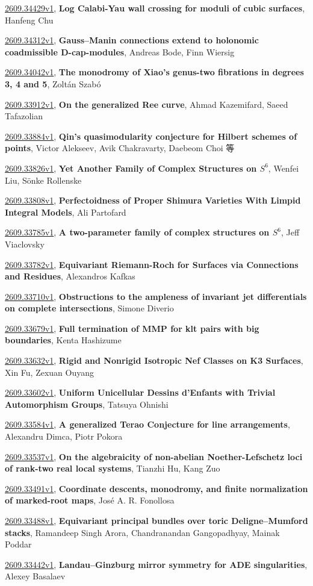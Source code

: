 \documentclass[9pt, a4paper]{article}
\theoremstyle{plain}
\theoremstyle{definition}
\theoremstyle{remark}
\newcommand{\arxiv}[3]{\href{https://arxiv.org/abs/#1}{#1}, \textbf{\textcolor{arxivblue}{#2}}, #3}
\begin{document}
\arxiv{2609.34429v1}{Log Calabi-Yau wall crossing for moduli of cubic surfaces}{Hanfeng Chu}

\arxiv{2609.34312v1}{Gauss--Manin connections extend to holonomic coadmissible D-cap-modules}{Andreas Bode, Finn Wiersig}

\arxiv{2609.34042v1}{The monodromy of Xiao's genus-two fibrations in degrees 3, 4 and 5}{Zoltán Szabó}

\arxiv{2609.33912v1}{On the generalized Ree curve}{Ahmad Kazemifard, Saeed Tafazolian}

\arxiv{2609.33884v1}{Qin's quasimodularity conjecture for Hilbert schemes of points}{Victor Alekseev, Avik Chakravarty, Daebeom Choi 等}

\arxiv{2609.33826v1}{Yet Another Family of Complex Structures on $S^6$}{Wenfei Liu, Sönke Rollenske}

\arxiv{2609.33808v1}{Perfectoidness of Proper Shimura Varieties With Limpid Integral Models}{Ali Partofard}

\arxiv{2609.33785v1}{A two-parameter family of complex structures on $S^6$}{Jeff Viaclovsky}

\arxiv{2609.33782v1}{Equivariant Riemann-Roch for Surfaces via Connections and Residues}{Alexandros Kafkas}

\arxiv{2609.33710v1}{Obstructions to the ampleness of invariant jet differentials on complete intersections}{Simone Diverio}

\arxiv{2609.33679v1}{Full termination of MMP for klt pairs with big boundaries}{Kenta Hashizume}

\arxiv{2609.33632v1}{Rigid and Nonrigid Isotropic Nef Classes on K3 Surfaces}{Xin Fu, Zexuan Ouyang}

\arxiv{2609.33602v1}{Uniform Unicellular Dessins d'Enfants with Trivial Automorphism Groups}{Tatsuya Ohnishi}

\arxiv{2609.33584v1}{A generalized Terao Conjecture for line arrangements}{Alexandru Dimca, Piotr Pokora}

\arxiv{2609.33537v1}{On the algebraicity of non-abelian Noether-Lefschetz loci of rank-two real local systems}{Tianzhi Hu, Kang Zuo}

\arxiv{2609.33491v1}{Coordinate descents, monodromy, and finite normalization of marked-root maps}{José A. R. Fonollosa}

\arxiv{2609.33488v1}{Equivariant principal bundles over toric Deligne--Mumford stacks}{Ramandeep Singh Arora, Chandranandan Gangopadhyay, Mainak Poddar}

\arxiv{2609.33442v1}{Landau--Ginzburg mirror symmetry for ADE singularities}{Alexey Basalaev}
\end{document}
